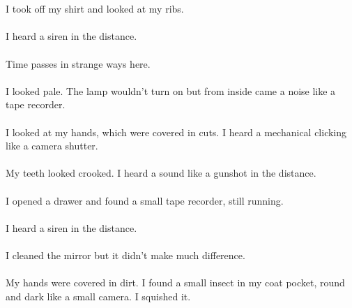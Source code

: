 \documentclass{article}
\begin{document}
    \section{}
    I took off my shirt and looked at my ribs. \\\\I heard a siren in the distance. \\\\Time passes in strange ways here. \\\\I looked pale. The lamp wouldn't turn on but from inside came a noise like a tape recorder. \\\\I looked at my hands, which were covered in cuts. I heard a mechanical clicking like a camera shutter. \\\\My teeth looked crooked. I heard a sound like a gunshot in the distance. \\\\I opened a drawer and found a small tape recorder, still running. \\\\I heard a siren in the distance. \\\\I cleaned the mirror but it didn't make much difference. \\\\My hands were covered in dirt. I found a small insect in my coat pocket, round and dark like a small camera. I squished it. \\\\
    \newpage
    
\end{document}
